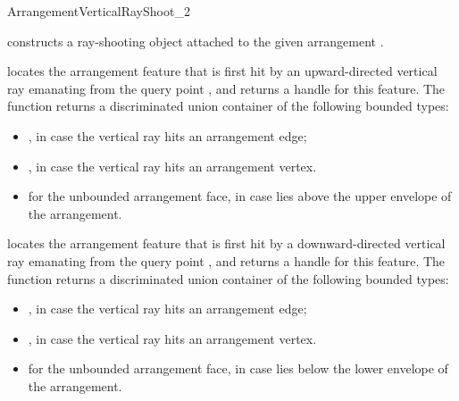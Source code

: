 \begin{ccRefConcept}{ArrangementVerticalRayShoot_2}
\ccCreation
{}


  {constructs a ray-shooting object \ccVar{} attached to the given
   arrangement .}

\ccQueryFunctions

  {locates the arrangement feature that is first hit by an upward-directed
   vertical ray emanating from the query point ,
   and returns a handle for this feature. The function returns a
   discriminated union container of the following bounded types:
   \begin{itemize}
   \item {}, in case the vertical
         ray hits an arrangement edge;
   \item {}, in case the vertical
         ray hits an arrangement vertex.
   \item {} for the unbounded arrangement
         face, in case  lies above the upper envelope of the
         arrangement.
   \end{itemize}
   }

  {locates the arrangement feature that is first hit by a downward-directed
   vertical ray emanating from the query point ,
   and returns a handle for this feature. The function returns a
   discriminated union container of the following bounded types:
   \begin{itemize}
   \item {}, in case the vertical
         ray hits an arrangement edge;
   \item {}, in case the vertical
         ray hits an arrangement vertex.
   \item {} for the unbounded arrangement
         face, in case  lies below the lower envelope of the
         arrangement.
   \end{itemize}
   }


\end{ccRefConcept}

